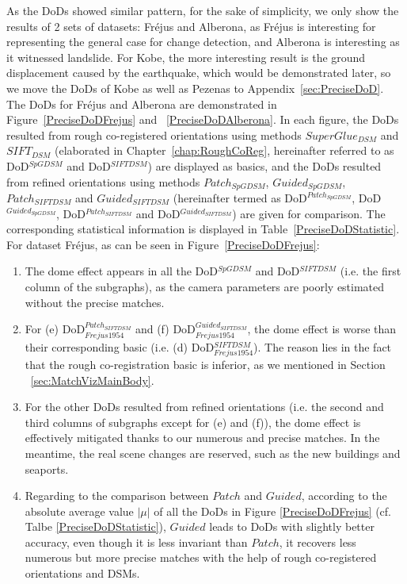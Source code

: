 As the \ac{DoD}s showed similar pattern, for the sake of simplicity, 
we only show the results of 2 sets of datasets: Fr{\'e}jus and Alberona, as Fr{\'e}jus is interesting for representing the general case for change detection, and Alberona is interesting as it witnessed landslide. 
For Kobe, the more interesting result is the ground displacement caused by the earthquake, which would be demonstrated later, so we move the \ac{DoD}s of Kobe as well as Pezenas to Appendix~\ref{sec:PreciseDoD}.\\

The \ac{DoD}s for Fr{\'e}jus and Alberona are demonstrated in Figure~\ref{PreciseDoDFrejus} and ~\ref{PreciseDoDAlberona}. 
In each figure, the \ac{DoD}s resulted from rough co-registered orientations using methods $SuperGlue_{DSM}$ and $SIFT_{DSM}$ (elaborated in Chapter~\ref{chap:RoughCoReg}, hereinafter referred to as DoD$^{SpGDSM}$ and DoD$^{SIFTDSM}$) are displayed as basics, and the \ac{DoD}s resulted from refined orientations using methods $Patch_{SpGDSM}$, $Guided_{SpGDSM}$, $Patch_{SIFTDSM}$ and $Guided_{SIFTDSM}$ (hereinafter termed as DoD$^{Patch_{SpGDSM}}$, DoD$^{Guided_{SpGDSM}}$, DoD$^{Patch_{SIFTDSM}}$ and DoD$^{Guided_{SIFTDSM}}$) are given for comparison. 
The corresponding statistical information is displayed in Table~\ref{PreciseDoDStatistic}.\\

For dataset Fr{\'e}jus, as can be seen in Figure~\ref{PreciseDoDFrejus}:\\
\begin{enumerate}
	\item The dome effect appears in all the DoD$^{SpGDSM}$ and DoD$^{SIFTDSM}$ (i.e. the first column of the subgraphs), as the camera parameters are poorly estimated without the precise matches.
	\item For (e) \ac{DoD}$_{Frejus1954}^{Patch_{SIFTDSM}}$ and (f) \ac{DoD}$_{Frejus1954}^{Guided_{SIFTDSM}}$, the dome effect is worse than their corresponding basic (i.e. (d) \ac{DoD}$_{Frejus1954}^{{SIFTDSM}}$).  The reason lies in the fact that the rough co-registration basic is inferior, as we mentioned in Section ~\ref{sec:MatchVizMainBody}.
	\item For the other \ac{DoD}s resulted from refined orientations (i.e. the second and third columns of subgraphs except for (e) and (f)), the dome effect is effectively mitigated thanks to our numerous and precise matches. In the meantime, the real scene changes are reserved, such as the new buildings and seaports.
	\item Regarding to the comparison between $Patch$ and $Guided$, according to the absolute average value $|\mu|$ of all the \ac{DoD}s in Figure \ref{PreciseDoDFrejus} (cf. Talbe \ref{PreciseDoDStatistic}), $Guided$ leads to \ac{DoD}s with slightly better accuracy, even though it is less invariant than $Patch$, it recovers less numerous but more precise matches with the help of rough co-registered orientations and \ac{DSM}s.
\end{enumerate}


